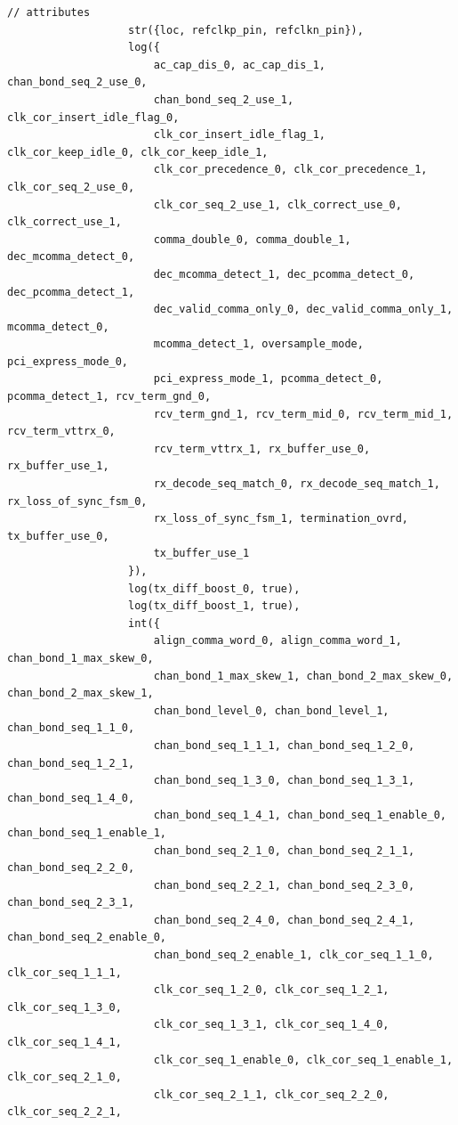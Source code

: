 \begin{lstlisting}[gobble=12, language=threepl]
                   // attributes
                   str({loc, refclkp_pin, refclkn_pin}),
                   log({
                       ac_cap_dis_0, ac_cap_dis_1, chan_bond_seq_2_use_0,
                       chan_bond_seq_2_use_1, clk_cor_insert_idle_flag_0,
                       clk_cor_insert_idle_flag_1, clk_cor_keep_idle_0, clk_cor_keep_idle_1,
                       clk_cor_precedence_0, clk_cor_precedence_1, clk_cor_seq_2_use_0,
                       clk_cor_seq_2_use_1, clk_correct_use_0, clk_correct_use_1,
                       comma_double_0, comma_double_1, dec_mcomma_detect_0,
                       dec_mcomma_detect_1, dec_pcomma_detect_0, dec_pcomma_detect_1,
                       dec_valid_comma_only_0, dec_valid_comma_only_1, mcomma_detect_0,
                       mcomma_detect_1, oversample_mode, pci_express_mode_0,
                       pci_express_mode_1, pcomma_detect_0, pcomma_detect_1, rcv_term_gnd_0,
                       rcv_term_gnd_1, rcv_term_mid_0, rcv_term_mid_1, rcv_term_vttrx_0,
                       rcv_term_vttrx_1, rx_buffer_use_0, rx_buffer_use_1,
                       rx_decode_seq_match_0, rx_decode_seq_match_1, rx_loss_of_sync_fsm_0,
                       rx_loss_of_sync_fsm_1, termination_ovrd, tx_buffer_use_0,
                       tx_buffer_use_1
                   }),
                   log(tx_diff_boost_0, true),
                   log(tx_diff_boost_1, true),
                   int({
                       align_comma_word_0, align_comma_word_1, chan_bond_1_max_skew_0,
                       chan_bond_1_max_skew_1, chan_bond_2_max_skew_0, chan_bond_2_max_skew_1,
                       chan_bond_level_0, chan_bond_level_1, chan_bond_seq_1_1_0,
                       chan_bond_seq_1_1_1, chan_bond_seq_1_2_0, chan_bond_seq_1_2_1,
                       chan_bond_seq_1_3_0, chan_bond_seq_1_3_1, chan_bond_seq_1_4_0,
                       chan_bond_seq_1_4_1, chan_bond_seq_1_enable_0, chan_bond_seq_1_enable_1,
                       chan_bond_seq_2_1_0, chan_bond_seq_2_1_1, chan_bond_seq_2_2_0,
                       chan_bond_seq_2_2_1, chan_bond_seq_2_3_0, chan_bond_seq_2_3_1,
                       chan_bond_seq_2_4_0, chan_bond_seq_2_4_1, chan_bond_seq_2_enable_0,
                       chan_bond_seq_2_enable_1, clk_cor_seq_1_1_0, clk_cor_seq_1_1_1,
                       clk_cor_seq_1_2_0, clk_cor_seq_1_2_1, clk_cor_seq_1_3_0,
                       clk_cor_seq_1_3_1, clk_cor_seq_1_4_0, clk_cor_seq_1_4_1,
                       clk_cor_seq_1_enable_0, clk_cor_seq_1_enable_1, clk_cor_seq_2_1_0,
                       clk_cor_seq_2_1_1, clk_cor_seq_2_2_0, clk_cor_seq_2_2_1,

\end{lstlisting}
